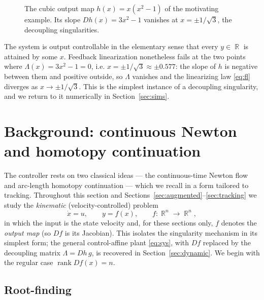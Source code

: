 \documentclass[11pt,american]{article}
\DeclareMathOperator{\R}{\mathbb{R}}
\DeclareMathOperator{\rank}{\operatorname{rank}}
\theoremstyle{definition}
\theoremstyle{plain}
\theoremstyle{remark}
\begin{document}
\begin{figure}[h]
\centering
{}
\caption{The cubic output map $h(x) = x(x^2-1)$ of the motivating example. Its slope $Dh(x) = 3x^2 - 1$ vanishes at $x = \pm 1/\sqrt3$, the decoupling singularities.}
\label{fig:toy_cubic}
\end{figure}

The system is output controllable in the elementary sense that every $y \in \R$ is attained by some $x$. Feedback linearization nonetheless fails at the two points where $\Lambda(x) = 3x^2 - 1 = 0$, i.e. $x = \pm 1/\sqrt3 \approx \pm 0.577$: the slope of $h$ is negative between them and positive outside, so $\Lambda$ vanishes and the linearizing law \eqref{eq:fl} diverges as $x \to \pm 1/\sqrt3$. This is the simplest instance of a decoupling singularity, and we return to it numerically in Section~\ref{sec:sims}.

\section{Background: continuous Newton and homotopy continuation}\label{sec:wellbehaved}

The controller rests on two classical ideas --- the continuous-time Newton flow and arc-length homotopy continuation --- which we recall in a form tailored to tracking. Throughout this section and Sections~\ref{sec:augmented}--\ref{sec:tracking} we study the \emph{kinematic} (velocity-controlled) problem
\begin{equation}\label{eq:kinematic}
\dot x = u, \qquad y = f(x), \qquad f:\R^n\to\R^n,
\end{equation}
in which the input is the state velocity and, for these sections only, $f$ denotes the \emph{output map} (so $Df$ is its Jacobian). This isolates the singularity mechanism in its simplest form; the general control-affine plant \eqref{eq:sys}, with $Df$ replaced by the decoupling matrix $\Lambda = Dh\,g$, is recovered in Section~\ref{sec:dynamic}. We begin with the regular case $\rank Df(x) = n$.

\subsection{Root-finding}
\end{document}
